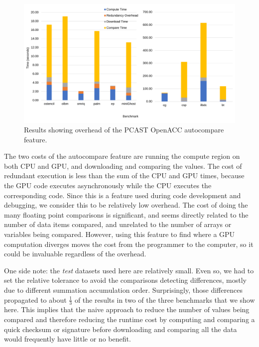
\begin{figure}[t]
    \centering
    \includegraphics [width=1\linewidth] {npic3.pdf}
    \caption{Results showing overhead of the PCAST OpenACC autocompare feature.}
    \label{fig:sle_figure}
\end{figure}


The two costs of the autocompare feature are running the compute region on both CPU and GPU, and downloading and comparing the values.
The cost of redundant execution is less than the sum of the CPU and GPU times, because the GPU code executes asynchronously while the CPU executes the corresponding code.
Since this is a feature used during code development and debugging, we consider this to be relatively low overhead.
The cost of doing the many floating point comparisons is significant, and seems directly related to the number of data items compared, and unrelated to the number of arrays or variables being compared.
However, using this feature to find where a GPU computation diverges moves the cost from the programmer to the computer, so it could be invaluable regardless of the overhead.

One side note: the \emph{test} datasets used here are relatively small.
Even so, we had to set the relative tolerance to avoid the comparisons detecting differences, mostly due to different summation accumulation order.
Surprisingly, those differences propagated to about $\frac{1}{3}$ of the results in two of the three benchmarks that we show here.
This implies that the naive approach to reduce the number of values being compared and therefore reducing the runtime cost by computing and comparing a quick checksum or signature before downloading and comparing all the data would frequently have little or no benefit.
